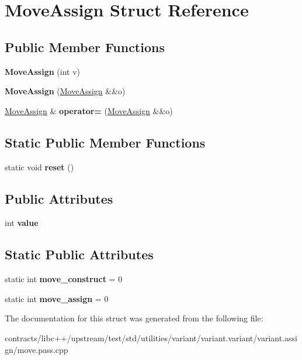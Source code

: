 \hypertarget{struct_move_assign}{}\section{Move\+Assign Struct Reference}
\label{struct_move_assign}
\subsection*{Public Member Functions}
\begin{DoxyCompactItemize}
\item 
\mbox{\label{struct_move_assign_a1f7d943889a1892db6d395d60f8e77c3}} 
{\bfseries Move\+Assign} (int v)
\item 
\mbox{\label{struct_move_assign_aca19525054b2fce69ce5108a32cedaa1}} 
{\bfseries Move\+Assign} (\mbox{\hyperlink{struct_move_assign}{Move\+Assign}} \&\&o)
\item 
\mbox{\label{struct_move_assign_a73fe592a64f49d0f2bd3557c0fe509ad}} 
\mbox{\hyperlink{struct_move_assign}{Move\+Assign}} \& {\bfseries operator=} (\mbox{\hyperlink{struct_move_assign}{Move\+Assign}} \&\&o)
\end{DoxyCompactItemize}
\subsection*{Static Public Member Functions}
\begin{DoxyCompactItemize}
\item 
\mbox{\label{struct_move_assign_acbd7e6c87370e7857c0d5bbdb2bf9b7e}} 
static void {\bfseries reset} ()
\end{DoxyCompactItemize}
\subsection*{Public Attributes}
\begin{DoxyCompactItemize}
\item 
\mbox{\label{struct_move_assign_ad33a95ea1d121c2a031a8d95eca1c052}} 
int {\bfseries value}
\end{DoxyCompactItemize}
\subsection*{Static Public Attributes}
\begin{DoxyCompactItemize}
\item 
\mbox{\label{struct_move_assign_a88be6e3597d068ed82882541570208fb}} 
static int {\bfseries move\+\_\+construct} = 0
\item 
\mbox{\label{struct_move_assign_a638d0d07fbb8b7a84c05ba19efdc895c}} 
static int {\bfseries move\+\_\+assign} = 0
\end{DoxyCompactItemize}


The documentation for this struct was generated from the following file\+:\begin{DoxyCompactItemize}
\item 
contracts/libc++/upstream/test/std/utilities/variant/variant.\+variant/variant.\+assign/move.\+pass.\+cpp\end{DoxyCompactItemize}
